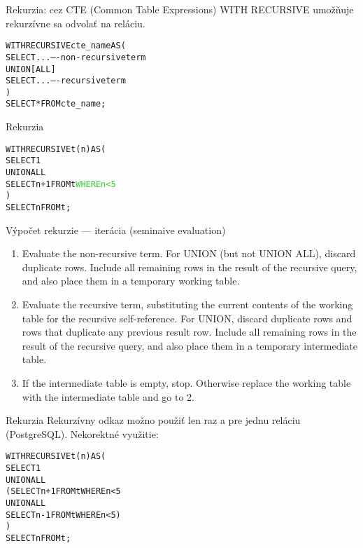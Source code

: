 \documentclass[12pt]{beamer}
\def\blue#1{\textcolor{Cerulean}{#1}}
\def\green#1{\textcolor{LimeGreen}{#1}}
\begin{document}
\begin{frame}[fragile]{Rekurzia: cez CTE (Common Table Expressions)}
\alert{WITH RECURSIVE} umožňuje rekurzívne sa odvolať na reláciu.
\bigskip
\begin{alltt}
\alert{WITH RECURSIVE} cte_name AS(
    SELECT ...  ---- non-recursive term
  UNION [ALL]
    SELECT ...  ---- recursive term
)
SELECT * FROM cte_name;
\end{alltt}
\end{frame}

\begin{frame}[fragile]{Rekurzia}
\begin{alltt}
\alert{WITH RECURSIVE} t(n) AS (
    SELECT 1
  UNION ALL
    SELECT n+1 FROM t \green{WHERE n < 5}
)
SELECT n FROM t;
\end{alltt}
\end{frame}

\begin{frame}[fragile]{Výpočet rekurzie --- iterácia (seminaive evaluation)}
\begin{enumerate}
\item Evaluate the \blue{non-recursive} term. For UNION (but not UNION ALL), discard duplicate rows.
Include all remaining rows in the result of the recursive query, and also place them in a temporary working table.

\item Evaluate the \blue{recursive} term, substituting the current contents of the working table for the recursive self-reference.
For UNION, discard duplicate rows and rows that duplicate any previous result row.
Include all remaining rows in the result of the recursive query, and also place them in a temporary intermediate table.

\item If the intermediate table is empty, stop. Otherwise replace the working table with the intermediate table and go to 2.
\end{enumerate}
\end{frame}

\begin{frame}[fragile]{Rekurzia}
Rekurzívny odkaz možno použiť len raz a pre jednu reláciu (PostgreSQL).
\alert{Nekorektné} využitie:
\begin{alltt}
WITH RECURSIVE t(n) AS (
    SELECT 1
  UNION ALL
    (SELECT n+1 FROM \blue{t} WHERE n < 5
        UNION ALL
     SELECT n-1 FROM \blue{t} WHERE n < 5)
)
SELECT n FROM t;
\end{alltt}
\end{frame}
\end{document}
